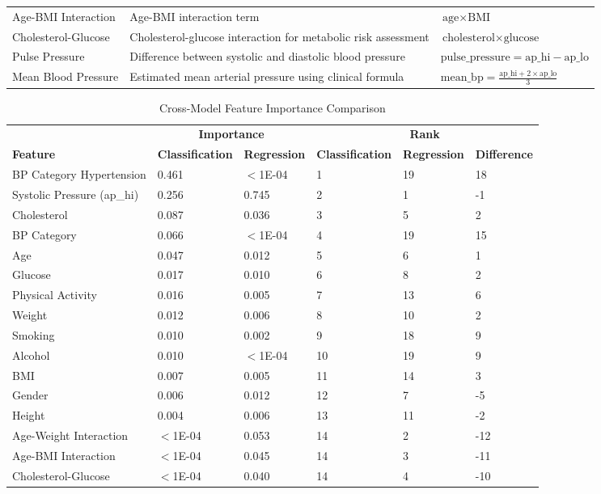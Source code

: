 \documentclass[conference]{IEEEtran}
\begin{document}
\begin{table}[h]
\begin{center}
\begin{tabular}{p{3cm}p{6cm}p{8cm}}
Age-BMI Interaction & Age-BMI interaction term & $\text{age} \times \text{BMI}$ \\
Cholesterol-Glucose & Cholesterol-glucose interaction for metabolic risk assessment & $\text{cholesterol} \times \text{glucose}$ \\
\addlinespace
Pulse Pressure & Difference between systolic and diastolic blood pressure & $\text{pulse\_pressure} = \text{ap\_hi} - \text{ap\_lo}$ \\
Mean Blood Pressure & Estimated mean arterial pressure using clinical formula & $\text{mean\_bp} = \frac{\text{ap\_hi} + 2 \times \text{ap\_lo}}{3}$ \\
\bottomrule
\end{tabular}
\end{center}
\end{table}

\begin{table}[h]
\centering
\caption{Cross-Model Feature Importance Comparison}
\label{tab:feature_importance_comparison}
\begin{center}
\begin{tabular}{p{3.5cm}p{2cm}p{2cm}p{1.5cm}p{1.5cm}p{1.5cm}}
\toprule
& \multicolumn{2}{c}{\textbf{Importance}} &  \multicolumn{3}{c}{\textbf{Rank}} \\
\cmidrule(lr){2-3} \cmidrule(lr){4-6}
\textbf{Feature} & \textbf{Classification} &  \textbf{Regression}& \textbf{Classification} &  \textbf{Regression} & \textbf{Difference} \\
\midrule
BP Category Hypertension & 0.461 & $<$1E-04 & 1 & 19 & 18 \\
Systolic Pressure (ap\_hi) & 0.256 & 0.745 & 2 & 1 & -1 \\
Cholesterol & 0.087 & 0.036 & 3 & 5 & 2 \\
BP Category & 0.066 & $<$1E-04 & 4 & 19 & 15 \\
Age & 0.047 & 0.012 & 5 & 6 & 1 \\
Glucose & 0.017 & 0.010 & 6 & 8 & 2 \\
Physical Activity & 0.016 & 0.005 & 7 & 13 & 6 \\
Weight & 0.012 & 0.006 & 8 & 10 & 2 \\
Smoking & 0.010 & 0.002 & 9 & 18 & 9 \\
Alcohol & 0.010 & $<$1E-04 & 10 & 19 & 9 \\
BMI & 0.007 & 0.005 & 11 & 14 & 3 \\
Gender & 0.006 & 0.012 & 12 & 7 & -5 \\
Height & 0.004 & 0.006 & 13 & 11 & -2 \\
Age-Weight Interaction & $<$1E-04 & 0.053 & 14 & 2 & -12 \\
Age-BMI Interaction & $<$1E-04 & 0.045 & 14 & 3 & -11 \\
Cholesterol-Glucose & $<$1E-04 & 0.040 & 14 & 4 & -10 \\
\bottomrule
\end{tabular}
\end{center}
\end{table}
\end{document}
